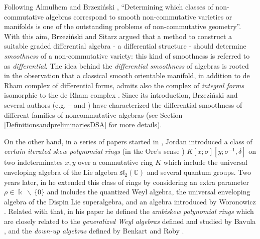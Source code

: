 \documentclass{amsart}
\theoremstyle{definition}
\theoremstyle{remark}
\numberwithin{equation}{section}
\begin{document}
Following Almulhem and Brzezi{\'n}ski \cite[Section 1]{AlmulhemBrzezinski2019}, \textquotedblleft Determining which classes of non-commutative algebras correspond to smooth non-commutative varieties or manifolds is one of the outstanding problems of non-commutative geometry\textquotedblright. With this aim, Brzezi{\'n}ski and Sitarz \cite{BrzezinskiSitarz2017} argued that a method to construct a suitable graded differential algebra - a differential structure - should determine {\em smoothness} of a non-commutative variety: this kind of smoothness is referred to as {\em differential}. The idea behind the {\em differential smoothness} of algebras is rooted in the observation that a classical smooth orientable manifold, in addition to de Rham complex of differential forms, admits also the complex of {\em integral forms} isomorphic to the de Rham complex \cite[Section 4.5]{Manin1997}. Since its introduction, Brzezi{\'n}ski and several authors (e.g. \cite{Brzezinski2014}--\cite{BrzezinskiSitarz2017} and \cite{Karacuha2015, KaracuhaLomp2014, ReyesSarmiento2022, RubianoReyes2024DSSPBWKt, RubianoReyes2024DSSPBWNote}) have characterized the differential smoothness of different families of noncommutative algebras (see Section \ref{DefinitionsandpreliminariesDSA} for more details). 

On the other hand, in a series of papers started in \cite{Jordan1993}, Jordan introduced a class of {\em certain iterated skew polynomial rings} (in the Ore's sense \cite{Ore1933}) $K[x; \sigma][y; \sigma^{-1}, \delta]$ on two indeterminates $x, y$ over a commutative ring $K$ which include the universal enveloping algebra of the Lie algebra $\mathfrak{sl}_2(\mathbb{C})$ and several quantum groups. Two years later, in \cite{Jordan1995} he extended this class of rings by considering an extra parameter $\rho \in \Bbbk \ \backslash \ \{0\}$ and includes the quantized Weyl algebra, the universal enveloping algebra of the Dispin Lie superalgebra, and an algebra introduced by Woronowicz \cite{Woronowicz1987}. Related with that, in his paper \cite{Jordan2000} he defined the {\em ambiskew polynomial rings} which are closely related to the {\em generalized Weyl algebras} defined and studied by Bavula \cite{Bavula1992, BavulaJordan2001}, and the {\em down-up algebras} defined by Benkart and Roby \cite{Benkart1998, BenkartRoby1998}. 
\end{document}
